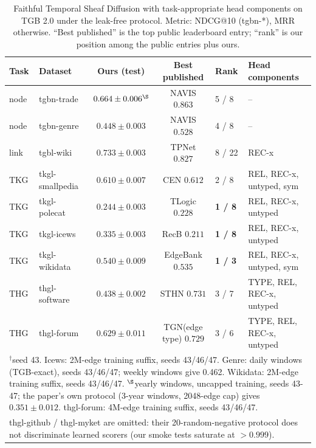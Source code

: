 \begin{table}[t]
\centering\small
\caption{Faithful Temporal Sheaf Diffusion with task-appropriate head components on TGB 2.0 under the
leak-free protocol. Metric: NDCG@10 (tgbn-*), MRR otherwise. ``Best published'' is the top public
leaderboard entry; ``rank'' is our position among the public entries plus ours.}
\begin{tabular}{llccll}
\toprule
Task & Dataset & Ours (test) & Best published & Rank & Head components \\
\midrule
node & tgbn-trade      & $0.664 \pm 0.006^{\S}$      & NAVIS $0.863$            & 5 / 8  & -- \\
node & tgbn-genre      & $0.448 \pm 0.003$          & NAVIS $0.528$            & 4 / 8  & -- \\
link & tgbl-wiki       & $0.733 \pm 0.003$           & TPNet $0.827$            & 8 / 22 & REC-x \\
TKG  & tkgl-smallpedia & $0.610 \pm 0.007$           & CEN $0.612$              & 2 / 8  & REL, REC-x, untyped, sym \\
TKG  & tkgl-polecat    & $\mathbf{0.244 \pm 0.003}$ & TLogic $0.228$           & \textbf{1 / 8} & REL, REC-x, untyped \\
TKG  & tkgl-icews      & $\mathbf{0.335 \pm 0.003}$ & RecB $0.211$             & \textbf{1 / 8} & REL, REC-x, untyped \\
TKG  & tkgl-wikidata   & $\mathbf{0.540 \pm 0.009}$ & EdgeBank $0.535$         & \textbf{1 / 3} & REL, REC-x, untyped, sym \\
THG  & thgl-software   & $0.438 \pm 0.002$           & STHN $0.731$             & 3 / 7  & TYPE, REL, REC-x, untyped \\
THG  & thgl-forum      & $0.629 \pm 0.011$           & TGN(edge type) $0.729$   & 3 / 6  & TYPE, REL, REC-x, untyped \\
\bottomrule
\multicolumn{6}{l}{\footnotesize $^{\dagger}$seed 43. Icews: 2M-edge training suffix, seeds 43/46/47. Genre: daily windows (TGB-exact), seeds 43/46/47; weekly windows give 0.462. Wikidata: 2M-edge training suffix, seeds 43/46/47. $^{\S}$yearly windows, uncapped training, seeds 43-47; the paper's own protocol (3-year windows, 2048-edge cap) gives $0.351 \pm 0.012$. thgl-forum: 4M-edge training suffix, seeds 43/46/47.} \\
\multicolumn{6}{l}{\footnotesize thgl-github / thgl-myket are omitted: their 20-random-negative protocol does not
discriminate learned scorers (our smoke tests saturate at $>0.999$).}
\end{tabular}
\end{table}

